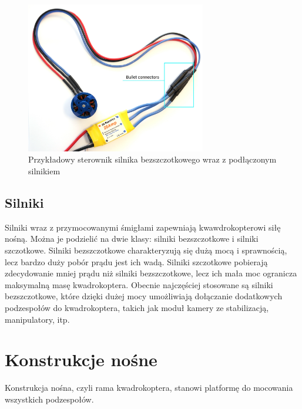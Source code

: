 \begin{figure}[H]
	\centering
		\includegraphics[width=0.7\textwidth]{Pictures/esc-motor-connect.jpg}
	\caption[Przykładowy sterownik silnika bezszczotkowego]{Przykładowy sterownik silnika bezszczotkowego wraz z podłączonym silnikiem}
	\label{fig:esc-motor-connect.jpg}
\end{figure}


\subsection{Silniki}

Silniki wraz z przymocowanymi śmigłami zapewniają kwawdrokopterowi siłę nośną. Można je podzielić na dwie klasy: silniki bezszczotkowe i silniki szczotkowe. Silniki bezszczotkowe charakteryzują się dużą mocą i sprawnością, lecz bardzo duży pobór prądu jest ich wadą. Silniki szczotkowe pobierają zdecydowanie mniej prądu niż silniki bezszczotkowe, lecz ich mała moc ogranicza maksymalną masę kwadrokoptera. Obecnie najczęściej stosowane są silniki bezszczotkowe, które dzięki dużej mocy umożliwiają dołączanie dodatkowych podzespołów do kwadrokoptera, takich jak moduł kamery ze stabilizacją, manipulatory, itp.


\section{Konstrukcje nośne}

Konstrukcja nośna, czyli rama kwadrokoptera, stanowi platformę do mocowania wszystkich podzespołów. 

